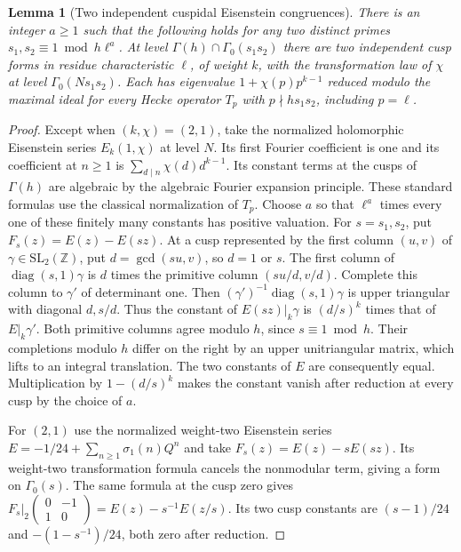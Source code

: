 \documentclass[a4paper,11pt]{article}
\newtheorem{lemma}[proposition]{Lemma}
\theoremstyle{definition}
\theoremstyle{remark}
\newcommand{\ZZ}{\mathbb Z}\newcommand{\ord}{\operatorname{ord}}
\numberwithin{equation}{section}
\begin{document}
\begin{lemma}[Two independent cuspidal Eisenstein congruences]
\label{lem:cusps240}
There is an integer \(a\ge1\) such that the following holds for
any two distinct primes \(s_1,s_2\equiv1\bmod h\ell^a\).
At level \(\Gamma(h)\cap\Gamma_0(s_1s_2)\) there are two
independent cusp forms in residue characteristic \(\ell\), of
weight \(k\), with the transformation law of \(\chi\) at level
\(\Gamma_0(Ns_1s_2)\). Each has eigenvalue
\(1+\chi(p)p^{k-1}\) reduced modulo the maximal ideal for every
Hecke operator \(T_p\) with \(p\nmid h s_1s_2\), including \(p=\ell\).
\end{lemma}
\begin{proof}
Except when \((k,\chi)=(2,1)\), take the normalized holomorphic
Eisenstein series \(E_k(1,\chi)\) at level \(N\). Its first
Fourier coefficient is one and its coefficient at \(n\ge1\)
is \(\sum_{d\mid n}\chi(d)d^{k-1}\). Its constant terms at the
cusps of \(\Gamma(h)\) are algebraic by the algebraic
Fourier expansion principle. These standard formulas use the
classical normalization of \(T_p\). \cite{IV-II-V-newforms}
Choose \(a\) so that \(\ell^a\) times every one of these finitely
many constants has positive valuation. For \(s=s_1,s_2\), put
\(F_s(z)=E(z)-E(sz)\). At a cusp represented by the first
column \((u,v)\) of \(\gamma\in\mathrm{SL}_2(\ZZ)\), put
\(d=\gcd(su,v)\), so \(d=1\) or \(s\). The first column of
\(\operatorname{diag}(s,1)\gamma\) is \(d\) times the primitive
column \((su/d,v/d)\). Complete this column to \(\gamma'\)
of determinant one. Then \((\gamma')^{-1}\operatorname{diag}(s,1)\gamma\)
is upper triangular with diagonal \(d,s/d\). Thus the constant
of \(E(sz)|_k\gamma\) is \((d/s)^k\) times that of \(E|_k\gamma'\).
Both primitive columns agree modulo \(h\), since \(s\equiv1\bmod h\).
Their completions modulo \(h\) differ on the right by an upper
unitriangular matrix, which lifts to an integral translation.
The two constants of \(E\) are consequently equal. Multiplication
by \(1-(d/s)^k\) makes the constant vanish after reduction at
every cusp by the choice of \(a\).

For \((2,1)\) use the normalized weight-two Eisenstein series
\(E=-1/24+\sum_{n\ge1}\sigma_1(n)Q^n\) and take
\(F_s(z)=E(z)-sE(sz)\). Its weight-two transformation formula
cancels the nonmodular term, giving a form on \(\Gamma_0(s)\).
The same formula at the cusp zero gives
\(F_s|_2\left(\begin{smallmatrix}0&-1\\1&0\end{smallmatrix}\right)
=E(z)-s^{-1}E(z/s)\). Its two cusp constants are
\((s-1)/24\) and \(-(1-s^{-1})/24\), both zero after reduction.


\end{proof}
\end{document}

